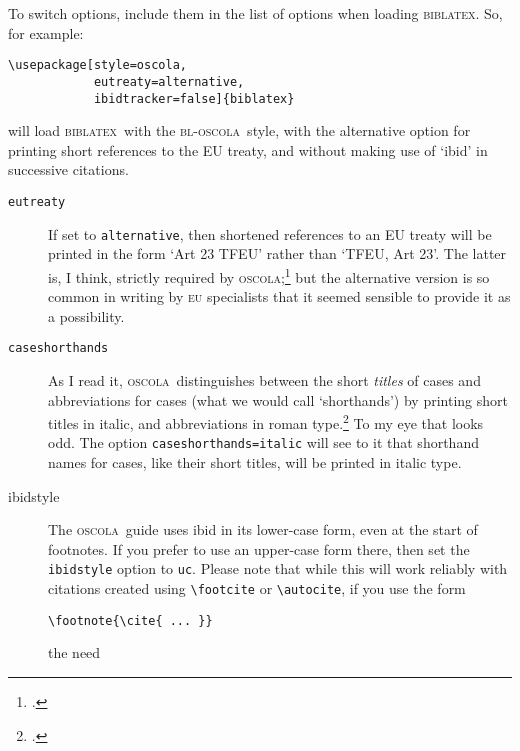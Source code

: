 \documentclass[a5paper,fontsize=9pt,DIV=1]{scrartcl}
\newcommand{\oscola}{\textsc{bl-oscola}}
\newcommand{\biblatex}{\textsc{biblatex}}
\newcommand{\oscolashort}{\textsc{oscola}\nocite{oscola}}
\newcounter{egcounter}\setcounter{egcounter}{0}
\newenvironment{bibexample}[1][]{%
  \medskip\par\small\noindent\ignorespaces
  \marginpar{[\refstepcounter{egcounter}\arabic{egcounter}]\label{#1}}
  \begin{minipage}[t]{0.95\linewidth}}
 {\end{minipage}\par\medskip}
\begin{document}
To switch options, include them in the list of options when loading
\biblatex. So, for example: 
\begin{bibexample}[optionseg]
\begin{verbatim} 
\usepackage[style=oscola,
            eutreaty=alternative, 
            ibidtracker=false]{biblatex} 
\end{verbatim} 
\end{bibexample}
\noindent will load \biblatex\ with the \oscola\ style, with the alternative option
for printing short references to the EU treaty, and without making use
of `ibid' in successive citations.

\begin{description}
\item[\texttt{eutreaty}] If\label{options} set to
  \texttt{alternative}, then shortened references to an EU treaty will
  be printed in the form `Art 23 TFEU' rather than `TFEU, Art 23'. The
  latter is, I think, strictly required by
  \oscolashort;\footcite[29]{oscola} but the alternative version is so
  common in writing by \textsc{eu} specialists that it seemed sensible
  to provide it as a possibility.
\item[\texttt{caseshorthands}]
  As I read it, \oscolashort\ distinguishes between the short
  \emph{titles} of cases and abbreviations for cases (what we would
  call `shorthands') by printing short titles in italic, and
  abbreviations in roman type.\footcite[See `example 4'][15]{oscola}
  To my eye that looks odd. The option \texttt{caseshorthands=italic}
  will see to it that shorthand names for cases, like their short
  titles, will be printed in italic type.
\item[ibidstyle]
  The \oscolashort\ guide uses ibid in its lower-case form, even at
  the start of footnotes. If you prefer to use an upper-case form
  there, then set the \texttt{ibidstyle} option to \texttt{uc}. Please
  note that while this will work reliably with citations created using
  \verb|\footcite| or \verb|\autocite|, if you use the
  form\begin{verbatim}\footnote{\cite{ ... }}\end{verbatim}the need

\end{description}
\end{document}
